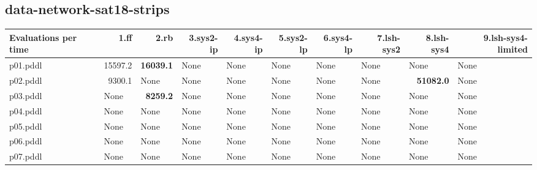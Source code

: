 \documentclass{article}
\begin{document}
\hypertarget{evaluations_per_time-data-network-sat18-strips}{}
\subsection*{data-network-sat18-strips}

\begin{tabular}{@{}lrrrrrrrrr@{}}
Evaluations per time & 1.ff & 2.rb & 3.sys2-ip & 4.sys4-ip & 5.sys2-lp & 6.sys4-lp & 7.lsh-sys2 & 8.lsh-sys4 & 9.lsh-sys4-limited \\
\midrule
p01.pddl & 15597.2 & \textbf{16039.1} & \multicolumn{1}{|l|}{None} & \multicolumn{1}{|l|}{None} & \multicolumn{1}{|l|}{None} & \multicolumn{1}{|l|}{None} & \multicolumn{1}{|l|}{None} & \multicolumn{1}{|l|}{None} & \multicolumn{1}{|l|}{None} \\
p02.pddl & 9300.1 & \multicolumn{1}{|l|}{None} & \multicolumn{1}{|l|}{None} & \multicolumn{1}{|l|}{None} & \multicolumn{1}{|l|}{None} & \multicolumn{1}{|l|}{None} & \multicolumn{1}{|l|}{None} & \textbf{51082.0} & \multicolumn{1}{|l|}{None} \\
p03.pddl & \multicolumn{1}{|l|}{None} & \textbf{8259.2} & \multicolumn{1}{|l|}{None} & \multicolumn{1}{|l|}{None} & \multicolumn{1}{|l|}{None} & \multicolumn{1}{|l|}{None} & \multicolumn{1}{|l|}{None} & \multicolumn{1}{|l|}{None} & \multicolumn{1}{|l|}{None} \\
p04.pddl & \multicolumn{1}{|l|}{None} & \multicolumn{1}{|l|}{None} & \multicolumn{1}{|l|}{None} & \multicolumn{1}{|l|}{None} & \multicolumn{1}{|l|}{None} & \multicolumn{1}{|l|}{None} & \multicolumn{1}{|l|}{None} & \multicolumn{1}{|l|}{None} & \multicolumn{1}{|l|}{None} \\
p05.pddl & \multicolumn{1}{|l|}{None} & \multicolumn{1}{|l|}{None} & \multicolumn{1}{|l|}{None} & \multicolumn{1}{|l|}{None} & \multicolumn{1}{|l|}{None} & \multicolumn{1}{|l|}{None} & \multicolumn{1}{|l|}{None} & \multicolumn{1}{|l|}{None} & \multicolumn{1}{|l|}{None} \\
p06.pddl & \multicolumn{1}{|l|}{None} & \multicolumn{1}{|l|}{None} & \multicolumn{1}{|l|}{None} & \multicolumn{1}{|l|}{None} & \multicolumn{1}{|l|}{None} & \multicolumn{1}{|l|}{None} & \multicolumn{1}{|l|}{None} & \multicolumn{1}{|l|}{None} & \multicolumn{1}{|l|}{None} \\
p07.pddl & \multicolumn{1}{|l|}{None} & \multicolumn{1}{|l|}{None} & \multicolumn{1}{|l|}{None} & \multicolumn{1}{|l|}{None} & \multicolumn{1}{|l|}{None} & \multicolumn{1}{|l|}{None} & \multicolumn{1}{|l|}{None} & \multicolumn{1}{|l|}{None} & \multicolumn{1}{|l|}{None} \\

\end{tabular}
\end{document}
